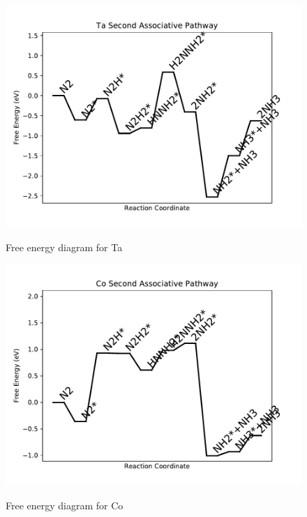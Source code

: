 \documentclass[journal=jacsat,manuscript=article]{achemso}
\begin{document}
\begin{figure}
\includegraphics[width=1\linewidth]{data/plots/Ta_associative_2.pdf}
\label{fig:Ta_associative_2}
\caption{Free energy diagram for Ta}
\end{figure}

\newpage
\begin{figure}
\includegraphics[width=1\linewidth]{data/plots/Co_associative_2.pdf}
\label{fig:Co_associative_2}
\caption{Free energy diagram for Co}
\end{figure}
\end{document}
